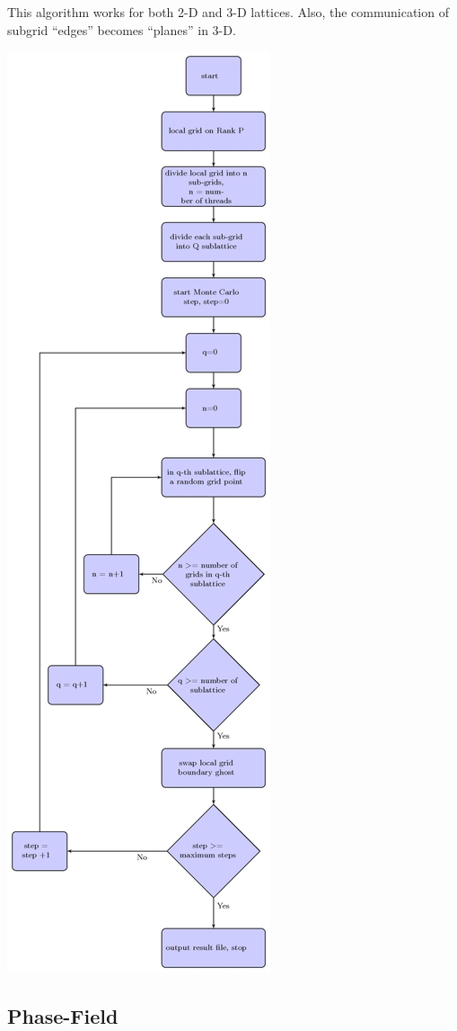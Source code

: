 \documentclass[11pt]{article}
\begin{document}
\begin{multicols}{2}
This algorithm works for both 2-D and 3-D lattices. Also, the communication of subgrid ``edges'' becomes ``planes'' in 3-D. 

\begin{minipage}{0.45\textwidth}\centering
  \includegraphics[height=0.95\textheight]{mc-fig-02}
\end{minipage}

\subsection{Phase-Field}

\label{LastPage}
\end{multicols}
\end{document}
